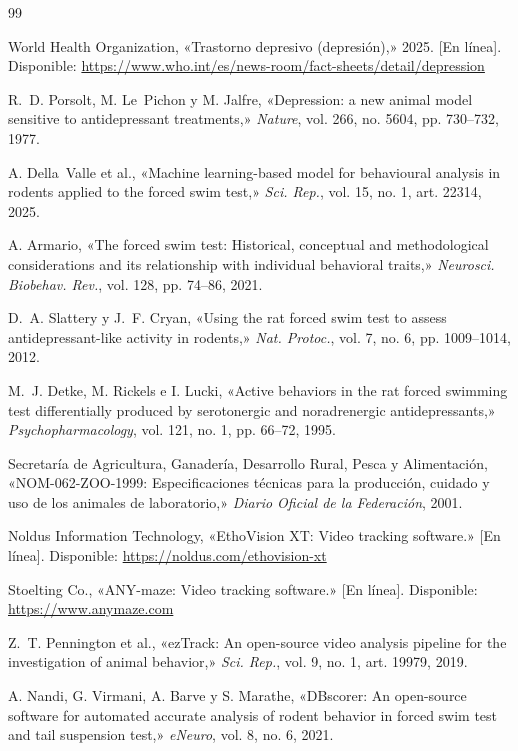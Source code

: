 \documentclass[conference,letterpaper]{IEEEtran}
\begin{document}
\begin{thebibliography}{99}

 World Health Organization, «Trastorno depresivo (depresión),» 2025. [En
línea]. Disponible: \url{https://www.who.int/es/news-room/fact-sheets/detail/depression}

 R.~D. Porsolt, M. Le~Pichon y M. Jalfre, «Depression: a new animal model
sensitive to antidepressant treatments,» \textit{Nature}, vol. 266, no. 5604, pp. 730--732,
1977.

 A. Della~Valle et al., «Machine learning-based model for behavioural
analysis in rodents applied to the forced swim test,» \textit{Sci. Rep.}, vol. 15, no. 1,
art. 22314, 2025.

 A. Armario, «The forced swim test: Historical, conceptual and
methodological considerations and its relationship with individual behavioral traits,»
\textit{Neurosci. Biobehav. Rev.}, vol. 128, pp. 74--86, 2021.

 D.~A. Slattery y J.~F. Cryan, «Using the rat forced swim test to assess
antidepressant-like activity in rodents,» \textit{Nat. Protoc.}, vol. 7, no. 6,
pp. 1009--1014, 2012.

 M.~J. Detke, M. Rickels e I. Lucki, «Active behaviors in the rat forced
swimming test differentially produced by serotonergic and noradrenergic antidepressants,»
\textit{Psychopharmacology}, vol. 121, no. 1, pp. 66--72, 1995.

 Secretaría de Agricultura, Ganadería, Desarrollo Rural, Pesca y Alimentación,
«NOM-062-ZOO-1999: Especificaciones técnicas para la producción, cuidado y uso de los
animales de laboratorio,» \textit{Diario Oficial de la Federación}, 2001.

 Noldus Information Technology, «EthoVision XT: Video tracking
software.» [En línea]. Disponible: \url{https://noldus.com/ethovision-xt}

 Stoelting Co., «ANY-maze: Video tracking software.» [En línea].
Disponible: \url{https://www.anymaze.com}

 Z.~T. Pennington et al., «ezTrack: An open-source video analysis pipeline
for the investigation of animal behavior,» \textit{Sci. Rep.}, vol. 9, no. 1, art. 19979,
2019.

 A. Nandi, G. Virmani, A. Barve y S. Marathe, «DBscorer: An open-source
software for automated accurate analysis of rodent behavior in forced swim test and tail
suspension test,» \textit{eNeuro}, vol. 8, no. 6, 2021.


\end{thebibliography}
\end{document}
